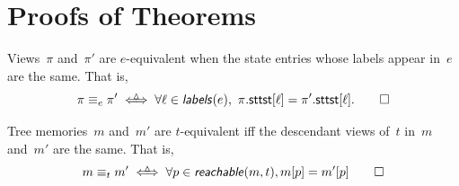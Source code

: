 \begin{center}
\end{center}

\clearpage
\begin{center}
  
\end{center}

\begin{center}
  
\end{center}

\clearpage
\begin{center}
  
\end{center}

\begin{center}
  
\end{center}

\begin{center}
  
\end{center}


\chapter{Proofs of Theorems}\label{app:chap:proofs}
\begin{defn}\label{def:equiv}
  Views~$\pi$ and~$\pi'$ are $e$-equivalent when the state entries whose labels appear in~$e$ are the same.
  That is,
  \[
    \pi \equiv_e \pi'
    \triangleiff
    \forall \ell \in \sem{labels}(e),\ \pi.\field{sttst}[\ell] = \pi'.\field{sttst}[\ell]. \qedhere
  \]
\end{defn}

\begin{defn}\label{def:memequiv}
  Tree memories~$m$ and~$m'$ are $t$-equivalent iff the descendant views of~$t$ in~$m$ and~$m'$ are the same.
  That is,
  \[
    m \equiv_t m'
    \triangleiff
    \forall p \in \sem{reachable}(m,t), m[p] = m'[p] \qedhere
  \]
\end{defn}

